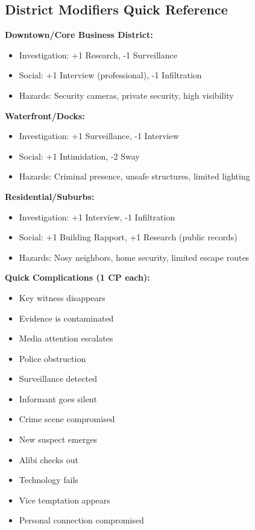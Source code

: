 \documentclass[11pt]{article}
\begin{document}
\subsection{District Modifiers Quick Reference}

\textbf{Downtown/Core Business District:}
\begin{itemize}
\item Investigation: +1 Research, -1 Surveillance
\item Social: +1 Interview (professional), -1 Infiltration
\item Hazards: Security cameras, private security, high visibility
\end{itemize}

\textbf{Waterfront/Docks:}
\begin{itemize}
\item Investigation: +1 Surveillance, -1 Interview
\item Social: +1 Intimidation, -2 Sway
\item Hazards: Criminal presence, unsafe structures, limited lighting
\end{itemize}

\textbf{Residential/Suburbs:}
\begin{itemize}
\item Investigation: +1 Interview, -1 Infiltration
\item Social: +1 Building Rapport, +1 Research (public records)
\item Hazards: Nosy neighbors, home security, limited escape routes
\end{itemize}

\textbf{Quick Complications (1 CP each):}
\begin{itemize}
\item Key witness disappears
\item Evidence is contaminated
\item Media attention escalates
\item Police obstruction
\item Surveillance detected
\item Informant goes silent
\item Crime scene compromised
\item New suspect emerges
\item Alibi checks out
\item Technology fails
\item Vice temptation appears
\item Personal connection compromised
\end{itemize}
\end{document}
